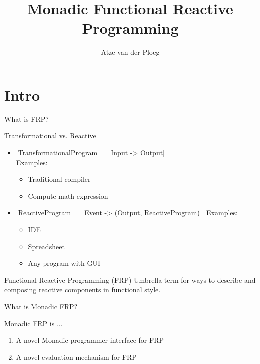 \documentclass{beamer}
\title{Monadic Functional Reactive Programming}
\author{Atze van der Ploeg}
\institute{
Centrum Wiskunde \& Informatica, Amsterdam, The Netherlands}
\begin{document}



\begin{frame}[plain]
\begin{center}
  \scalebox{12}{$\bind$}
\end{center}
\vspace{-0.5cm}
  \titlepage
\end{frame}
\section{Intro}
\begin{frame}{What is FRP?}
\begin{block}{Transformational vs. Reactive}
\begin{itemize}
\item |TransformationalProgram =~ Input -> Output|\\
Examples: \begin{itemize}
\item Traditional compiler
\item Compute math expression
\end{itemize}

\item |ReactiveProgram =~ Event -> (Output, ReactiveProgram) |
Examples: \begin{itemize}
\item IDE
\item Spreadsheet
\item Any program with GUI
\end{itemize}
\end{itemize}
\end{block}
\pause
\begin{block}{Functional Reactive Programming (FRP)}
Umbrella term for ways to describe and composing reactive components in functional style.
\end{block}
\end{frame}

\begin{frame}{What is Monadic FRP?}
\begin{block}{Monadic FRP is ...}
\begin{enumerate}
\item A novel Monadic programmer interface for FRP
\item A novel evaluation mechanism for FRP

\end{enumerate}
\end{block}
\end{frame}
\end{document}
